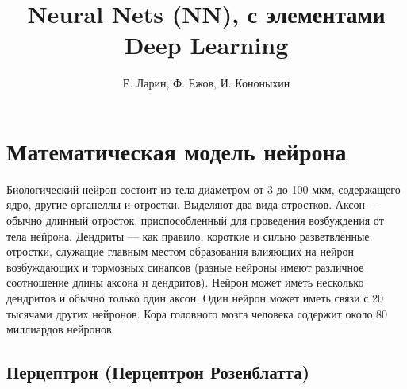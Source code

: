 \documentclass[11pt, oneside]{article}   	%
\begin{document}
	\author{Е. Ларин, Ф. Ежов, И. Кононыхин }
	\title{Neural Nets (NN), с элементами Deep Learning}
	\date{}
	
	\maketitle
	\section{Математическая модель нейрона}
	
	Биологический нейрон состоит из тела диаметром от 3 до 100 мкм, содержащего ядро, другие органеллы и отростки. Выделяют два вида отростков. Аксон — обычно длинный отросток, приспособленный для проведения возбуждения от тела нейрона. Дендриты — как правило, короткие и сильно разветвлённые отростки, служащие главным местом образования влияющих на нейрон возбуждающих и тормозных синапсов (разные нейроны имеют различное соотношение длины аксона и дендритов). Нейрон может иметь несколько дендритов и обычно только один аксон. Один нейрон может иметь связи с 20 тысячами других нейронов. Кора головного мозга человека содержит около 80 миллиардов нейронов. 
	
	\begin{figure}[h]
	\end{figure}


	\subsection{Перцептрон (Перцептрон Розенблатта)}	
	
\end{document}
